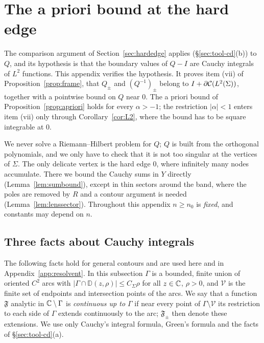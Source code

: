 
\section{The a priori bound at the hard edge}\label{app:apriori}

The comparison argument of Section~\ref{sec:hardedge} applies \cite[Theorem~4.4]{CD} (\S\ref{sec:tool-cd}(b)) to
$Q$, and its hypothesis is that the boundary values of $Q-I$ are Cauchy integrals of $L^2$ functions. This appendix
verifies the hypothesis. It proves item (vii) of Proposition~\ref{prop:frame}, that $Q_\pm$ and $(Q^{-1})_\pm$ belong to
$I+\partial\mathcal{C}(L^2(\Sigma))$, together with a pointwise bound on $Q$ near $0$. The a priori bound of
Proposition~\ref{prop:apriori} holds for every $\alpha>-1$; the restriction $|\alpha|<1$ enters item (vii) only through
Corollary~\ref{cor:L2}, where the bound has to be square integrable at $0$.

We never solve a Riemann--Hilbert problem for $Q$; $Q$ is built from the orthogonal polynomials, and we only have to
check that it is not too singular at the vertices of $\Sigma$. The only delicate vertex is the hard edge $0$, where
infinitely many nodes accumulate. There we bound the Cauchy sums in $Y$ directly (Lemma~\ref{lem:sumbound}), except in
thin sectors around the band, where the poles are removed by $R$ and a contour argument is needed
(Lemma~\ref{lem:lenssector}). Throughout this appendix $n\ge n_0$ is \emph{fixed}, and constants may depend on $n$.

\subsection{Three facts about Cauchy integrals}\label{sec:apriori-cauchy}

The following facts hold for general contours and are used here and in Appendix~\ref{app:resolvent}. In this
subsection $\Gamma$ is a bounded, finite union of oriented $C^2$ arcs with $|\Gamma\cap \mathbb D(z,\rho)|\le C_\Sigma\rho$ for
all $z\in\mathbb{C}$, $\rho>0$, and $\mathcal V$ is the finite set of endpoints and intersection points of the arcs. We say that a
function $\mathfrak F$ analytic in $\mathbb{C}\setminus\Gamma$ is \emph{continuous up to $\Gamma$} if near every point of
$\Gamma\setminus\mathcal V$ its restriction to each side of $\Gamma$ extends continuously to the arc; $\mathfrak F_\pm$ then
denote these extensions. We use only Cauchy's integral formula, Green's formula and the facts of \S\ref{sec:tool-cd}(a).

